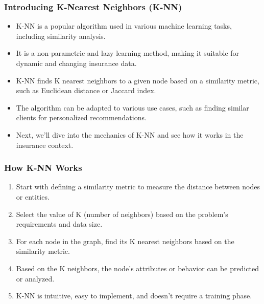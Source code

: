 \begin{frame}[fragile]\frametitle{Introducing K-Nearest Neighbors (K-NN)}
\begin{itemize}
\item K-NN is a popular algorithm used in various machine learning tasks, including similarity analysis.
\item It is a non-parametric and lazy learning method, making it suitable for dynamic and changing insurance data.
\item K-NN finds K nearest neighbors to a given node based on a similarity metric, such as Euclidean distance or Jaccard index.
\item The algorithm can be adapted to various use cases, such as finding similar clients for personalized recommendations.
\item Next, we'll dive into the mechanics of K-NN and see how it works in the insurance context.
\end{itemize}
\end{frame}

\begin{frame}[fragile]\frametitle{How K-NN Works}
\begin{enumerate}
\item Start with defining a similarity metric to measure the distance between nodes or entities.
\item Select the value of K (number of neighbors) based on the problem's requirements and data size.
\item For each node in the graph, find its K nearest neighbors based on the similarity metric.
\item Based on the K neighbors, the node's attributes or behavior can be predicted or analyzed.
\item K-NN is intuitive, easy to implement, and doesn't require a training phase.
\end{enumerate}
\end{frame}

